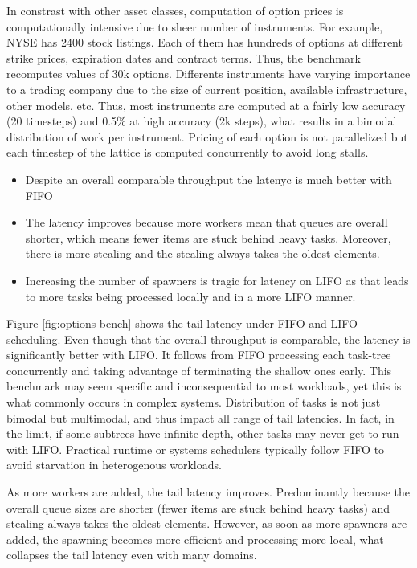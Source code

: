 \documentclass[12pt,a4paper,twoside]{report}
\begin{document}
In constrast with other asset classes, computation of option prices is computationally intensive due to sheer number of instruments. For example, NYSE has 2400 stock listings. Each of them has hundreds of options at different strike prices, expiration dates and contract terms. Thus, the benchmark recomputes values of 30k options. Differents instruments have varying importance to a trading company due to the size of current position, available infrastructure, other models, etc. Thus, most instruments are computed at a fairly low accuracy (20 timesteps) and 0.5\% at high accuracy (2k steps), what results in a bimodal distribution of work per instrument. Pricing of each option is not parallelized but each timestep of the lattice is computed concurrently to avoid long stalls. 

\begin{itemize}
    \item Despite an overall comparable throughput the latenyc is much better with FIFO
    \item The latency improves because more workers mean that queues are overall shorter, which means fewer items are stuck behind heavy tasks. Moreover, there is more stealing and the stealing always takes the oldest elements. 
    \item Increasing the number of spawners is tragic for latency on LIFO as that leads to more tasks being processed locally and in a more LIFO manner. 
\end{itemize}

Figure \ref{fig:options-bench} shows the tail latency under FIFO and LIFO scheduling. Even though that the overall throughput is comparable, the latency is significantly better with LIFO. It follows from FIFO processing each task-tree concurrently and taking advantage of terminating the shallow ones early. This benchmark may seem specific and inconsequential to most workloads, yet this is what commonly occurs in complex systems. Distribution of tasks is not just bimodal but multimodal, and thus impact all range of tail latencies. In fact, in the limit, if some subtrees have infinite depth, other tasks may never get to run with LIFO. Practical runtime or systems schedulers typically follow FIFO to avoid starvation in heterogenous workloads.   

As more workers are added, the tail latency improves. Predominantly because the overall queue sizes are shorter (fewer items are stuck behind heavy tasks) and stealing always takes the oldest elements. However, as soon as more spawners are added, the spawning becomes more efficient and processing more local, what collapses the tail latency even with many domains. 
\end{document}
